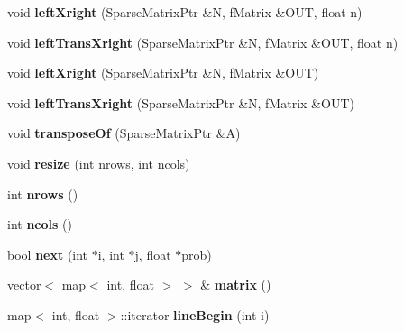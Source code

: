 \begin{DoxyCompactItemize}
void {\bfseries left\+Xright} (Sparse\+Matrix\+Ptr \&N, f\+Matrix \&O\+UT, float n)
\item 
\mbox{\label{classtops_1_1SparseMatrix_a471cd61b541e26492040fcff198d4bff}} 
void {\bfseries left\+Trans\+Xright} (Sparse\+Matrix\+Ptr \&N, f\+Matrix \&O\+UT, float n)
\item 
\mbox{\label{classtops_1_1SparseMatrix_a2c08d58ef1273e1f3e3fb3b9613bc090}} 
void {\bfseries left\+Xright} (Sparse\+Matrix\+Ptr \&N, f\+Matrix \&O\+UT)
\item 
\mbox{\label{classtops_1_1SparseMatrix_a3a5d5bf24a29d08222eb3970d69ff8c4}} 
void {\bfseries left\+Trans\+Xright} (Sparse\+Matrix\+Ptr \&N, f\+Matrix \&O\+UT)
\item 
\mbox{\label{classtops_1_1SparseMatrix_a4fbcbf55d3740a7ad1dc4cfe20f7ae8b}} 
void {\bfseries transpose\+Of} (Sparse\+Matrix\+Ptr \&A)
\item 
\mbox{\label{classtops_1_1SparseMatrix_aacc8c863b1af0b3811ccda9f2a184bad}} 
void {\bfseries resize} (int nrows, int ncols)
\item 
\mbox{\label{classtops_1_1SparseMatrix_a7db70f4857d260d6b0d9b7541ecafd70}} 
int {\bfseries nrows} ()
\item 
\mbox{\label{classtops_1_1SparseMatrix_a489e4cf11c8f15242561bdc8fa141215}} 
int {\bfseries ncols} ()
\item 
\mbox{\label{classtops_1_1SparseMatrix_a9fd71945b10f36b68dc0c88229a2ccf6}} 
bool {\bfseries next} (int $\ast$i, int $\ast$j, float $\ast$prob)
\item 
\mbox{\label{classtops_1_1SparseMatrix_ad4fe6eff4cad16417ba2b46bf4cb49ac}} 
vector$<$ map$<$ int, float $>$ $>$ \& {\bfseries matrix} ()
\item 
\mbox{\label{classtops_1_1SparseMatrix_a344706ad46f08d9b6acb673643ec0982}} 
map$<$ int, float $>$\+::iterator {\bfseries line\+Begin} (int i)

\end{DoxyCompactItemize}

